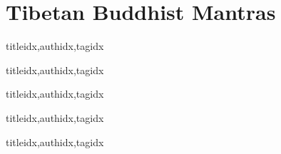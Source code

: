 \documentclass[twoside,10pt]{book}
\begin{document}
    \section{Tibetan Buddhist Mantras}
      \begin{songs}{titleidx,authidx,tagidx}
        \setcounter{songnum}{150}
        
      \end{songs}

  \clearpage\scleardpage
    \begin{songs}{titleidx,authidx,tagidx}
      \setcounter{songnum}{200}
      
    \end{songs}

  \clearpage\scleardpage
    \begin{songs}{titleidx,authidx,tagidx}
      \setcounter{songnum}{300}
      
    \end{songs}

  \clearpage\scleardpage
    \begin{songs}{titleidx,authidx,tagidx}
      \setcounter{songnum}{400}
      
    \end{songs}

  \clearpage\scleardpage
    \begin{songs}{titleidx,authidx,tagidx}
      \setcounter{songnum}{700}
      
    \end{songs}
\end{document}

